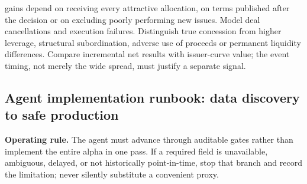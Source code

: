 \documentclass[10pt]{article}
\begin{document}
gains depend on receiving every attractive allocation, on terms published after the decision or on excluding poorly performing new issues. Model deal cancellations and execution failures. Distinguish true concession from higher leverage, structural subordination, adverse use of proceeds or permanent liquidity differences. Compare incremental net results with issuer-curve value; the event timing, not merely the wide spread, must justify a separate signal.
\subsection{Agent implementation runbook: data discovery to safe production}
\textbf{Operating rule.} The agent must advance through auditable gates rather than implement the entire alpha in one pass. If a required field is unavailable, ambiguous, delayed, or not historically point-in-time, stop that branch and record the limitation; never silently substitute a convenient proxy.
\end{document}
